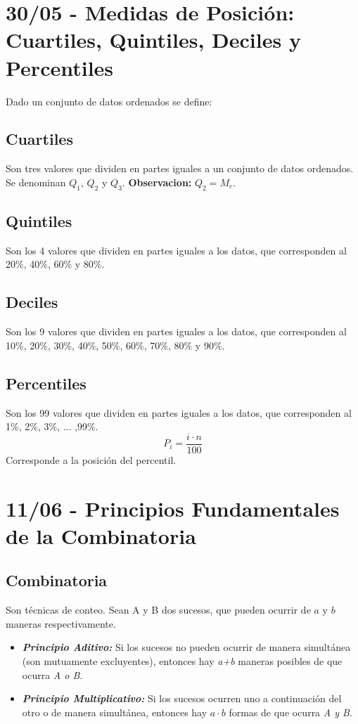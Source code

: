 \documentclass[12pt, letterpaper]{article}
\begin{document}
\section{30/05 - Medidas de Posición: Cuartiles, Quintiles, Deciles y Percentiles}
Dado un conjunto de datos ordenados se define:

\subsection{Cuartiles}
Son tres valores que dividen en partes iguales a un conjunto de datos ordenados. Se denominan $Q_1$, $Q_2$ y $Q_3$.
\textbf{Observacion:} $Q_2 = M_e$.

\subsection{Quintiles}
Son los 4 valores que dividen en partes iguales a los datos, que corresponden al 20\%, 40\%, 60\% y 80\%.

\subsection{Deciles}
Son los 9 valores que dividen en partes iguales a los datos, que corresponden al 10\%, 20\%, 30\%, 40\%, 50\%, 60\%, 70\%, 80\% y 90\%.


\subsection{Percentiles}
Son los 99 valores que dividen en partes iguales a los datos, que corresponden al 1\%, 2\%, 3\%, ... ,99\%.
\[ P_i= \frac{i \cdot n}{100} \] Corresponde a la posición del percentil.
\newpage

\section{11/06 - Principios Fundamentales de la Combinatoria}
\subsection{Combinatoria}
Son técnicas de conteo. Sean A y B dos sucesos, que pueden ocurrir de $a$ y $b$ maneras respectivamente.
\begin{itemize}
	\item \textbf{\textit{Principio Aditivo:}} Si los sucesos no pueden ocurrir de manera simultánea (son mutuamente excluyentes), entonces hay \textit{a+b} maneras posibles de que ocurra \textit{A o B}.
	\item \textbf{\textit{Principio Multiplicativo:}} Si los sucesos ocurren uno a continuación del otro o de manera simultánea, entonces hay $a \cdot b$ formas de que ocurra \textit{A y B}.
\end{itemize}
\end{document}
